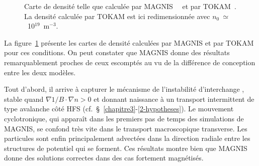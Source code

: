 \begin{refsection}
\begin{figure}[!htbp]
  \centering
    \caption{Carte de densité telle que calculée par MAGNIS~~
et par TOKAM~. La densité calculée par TOKAM est ici
redimensionnée avec $n_0~\simeq$~10$^{19}$~m$^{-3}$.}
    \label{4-TokamDensite}
\end{figure}


La figure~\ref{4-TokamDensite} présente les cartes de densité
calculées par MAGNIS et par TOKAM pour ces conditions. On peut
constater que MAGNIS donne des résultats remarquablement proches de ceux
escomptés au vu de la différence de conception entre les deux modèles. 

Tout d'abord, il arrive à capturer le mécanisme de l'instabilité d'interchange ,
stable quand $\nabla 1/B\cdot\nabla n>0$ et donnant naissance à un transport intermittent de
type avalanche côté HFS (cf.~\S~\ref{chapitre3}-\ref{2-hypotheses}). Le
mouvement cyclotronique, qui apparaît dans les premiers pas de temps des
simulations de MAGNIS, se confond très vite dans le transport macroscopique
transverse. Les particules sont enfin principalement advectées dans la
direction radiale entre les structures de potentiel qui se forment. Ces
résultats montre bien que MAGNIS donne des solutions correctes dans
des cas fortement magnétisés.


\end{refsection}

